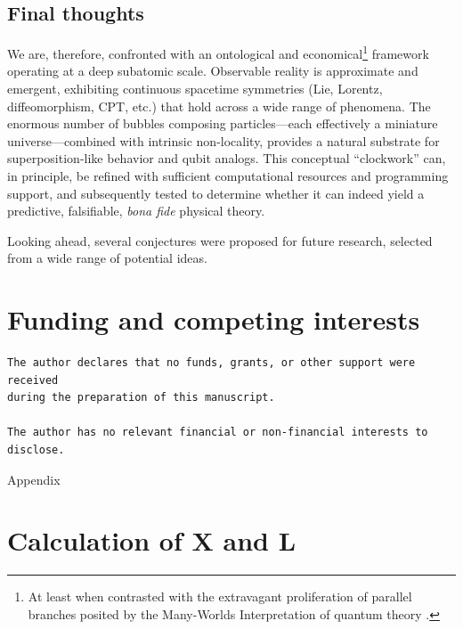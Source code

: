 \documentclass[12pt,english]{article}
\begin{document}
\subsection{Final thoughts}

We are, therefore, confronted with an ontological and economical\footnote{At least when contrasted with the extravagant proliferation of parallel branches posited by the Many-Worlds Interpretation of quantum theory \cite{everett1957}.} framework operating at a deep subatomic scale. Observable reality is approximate and emergent, exhibiting continuous spacetime symmetries (Lie, Lorentz, diffeomorphism, CPT, etc.) that hold across a wide range of phenomena. The enormous number of bubbles composing particles—each effectively a miniature universe—combined with intrinsic non-locality, provides a natural substrate for superposition-like behavior and qubit analogs. This conceptual “clockwork” can, in principle, be refined with sufficient computational resources and programming support, and subsequently tested to determine whether it can indeed yield a predictive, falsifiable, \emph{bona fide} physical theory.

Looking ahead, several conjectures were proposed for future research, selected from a wide range of potential ideas.


\section*{Funding and competing interests}
\begin{verbatim}
The author declares that no funds, grants, or other support were received 
during the preparation of this manuscript.

The author has no relevant financial or non-financial interests to disclose.
\end{verbatim}

\printbibliography


\newpage{}


\appendix
\begin{center}
{\LARGE{}Appendix}{\LARGE\par}
\par\end{center}

\section{Calculation of X and L\label{sec:Calculation-of-X}}
\end{document}

